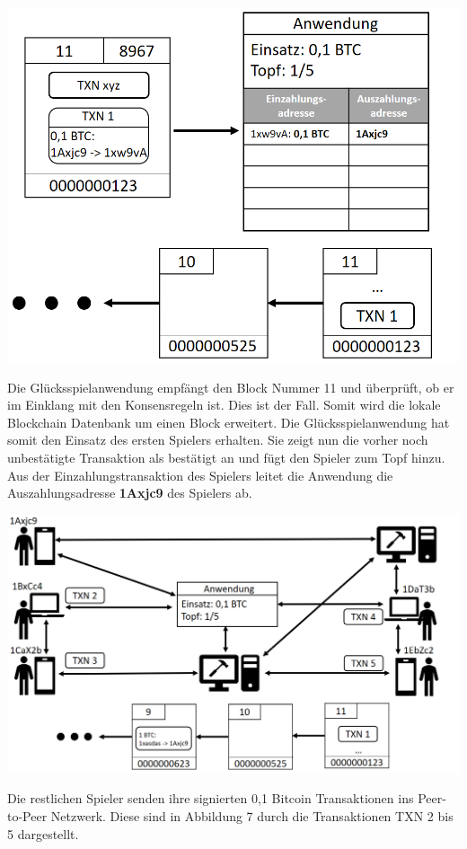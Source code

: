 \vspace{1cm}
\begin{minipage}{0.55\textwidth}
\includegraphics[width=\textwidth]{Figures/konzept_btc/konzept6}
\centering
\decoRule
{}
\label{fig:konzept6}
\end{minipage}
\begin{minipage}{0.45\textwidth}
Die Glücksspielanwendung empfängt den Block Nummer 11 und überprüft, ob er im Einklang mit den Konsensregeln ist. Dies ist der Fall. Somit wird die lokale Blockchain Datenbank um einen Block erweitert. Die Glücksspielanwendung hat somit den Einsatz des ersten Spielers erhalten. Sie zeigt nun die vorher noch unbestätigte Transaktion als bestätigt an und fügt den Spieler zum Topf hinzu. Aus der Einzahlungstransaktion des Spielers leitet die Anwendung die Auszahlungsadresse \textbf{1Axjc9} des Spielers ab. 
\end{minipage}

\vspace{1cm}
\begin{minipage}{0.55\textwidth}
\includegraphics[width=\textwidth]{Figures/konzept_btc/konzept7}
\centering
\decoRule
{}
\label{fig:konzept7}
\end{minipage}
\begin{minipage}{0.45\textwidth}
Die restlichen Spieler senden ihre signierten 0,1 Bitcoin Transaktionen ins Peer-to-Peer Netzwerk. Diese sind in Abbildung 7 durch die Transaktionen TXN 2 bis 5 dargestellt.
\end{minipage}

